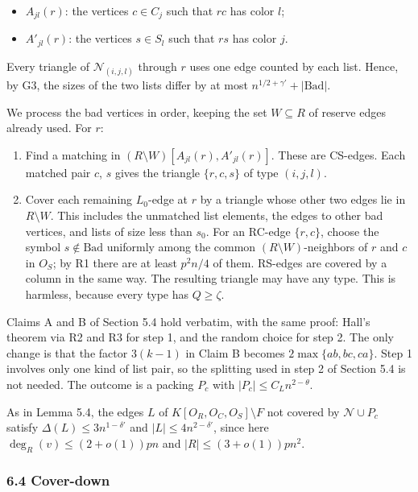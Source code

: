 \documentclass[english,11pt,a4paper]{article}
\providecommand{\tightlist}{\setlength{\itemsep}{0pt}\setlength{\parskip}{0pt}}
\begin{document}
\begin{itemize}
\tightlist
\item
  \(A_{jl}(r)\): the vertices \(c\in C_j\) such that \(rc\) has color \(l\);
\item
  \(A'_{jl}(r)\): the vertices \(s\in S_l\) such that \(rs\) has color \(j\).
\end{itemize}

Every triangle of \(\mathcal N_{(i,j,l)}\) through \(r\) uses one edge counted by each list. Hence, by G3, the sizes of the two lists differ by at most \(n^{1/2+\gamma'}+|\mathrm{Bad}|\).

We process the bad vertices in order, keeping the set \(W\subseteq R\) of reserve edges already used. For \(r\):

\begin{enumerate}
\def\labelenumi{\arabic{enumi}.}
\tightlist
\item
  Find a matching in \((R\setminus W)[A_{jl}(r),A'_{jl}(r)]\). These are CS-edges. Each matched pair \(c\), \(s\) gives the triangle \(\{r,c,s\}\) of type \((i,j,l)\).
\item
  Cover each remaining \(L_0\)-edge at \(r\) by a triangle whose other two edges lie in \(R\setminus W\). This includes the unmatched list elements, the edges to other bad vertices, and lists of size less than \(s_0\). For an RC-edge \(\{r,c\}\), choose the symbol \(s\notin\mathrm{Bad}\) uniformly among the common \((R\setminus W)\)-neighbors of \(r\) and \(c\) in \(O_S\); by R1 there are at least \(p^2n/4\) of them. RS-edges are covered by a column in the same way. The resulting triangle may have any type. This is harmless, because every type has \(Q\ge\zeta\).
\end{enumerate}

Claims A and B of Section 5.4 hold verbatim, with the same proof: Hall's theorem via R2 and R3 for step 1, and the random choice for step 2. The only change is that the factor \(3(k-1)\) in Claim B becomes \(2\max\{ab,bc,ca\}\). Step 1 involves only one kind of list pair, so the splitting used in step 2 of Section 5.4 is not needed. The outcome is a packing \(P_c\) with \(|P_c|\le C_Ln^{2-\theta}\).

As in Lemma 5.4, the edges \(L\) of \(K[O_R,O_C,O_S]\setminus F\) not covered by \(\mathcal N\cup P_c\) satisfy \(\Delta(L)\le3n^{1-\delta'}\) and \(|L|\le4n^{2-\delta'}\), since here \(\deg_R(v)\le(2+o(1))pn\) and \(|R|\le(3+o(1))pn^2\).

\subsubsection{6.4 Cover-down}\label{cover-down-1}
\end{document}
